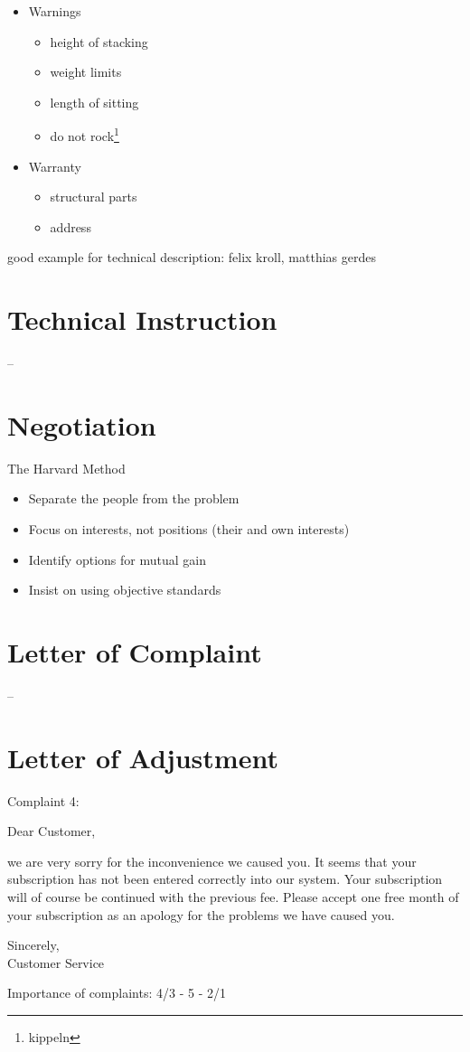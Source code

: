 \begin{itemize}
\begin{itemize}
\begin{itemize}
\end{itemize}
\end{itemize}
\item Warnings
\begin{itemize}
\item height of stacking
\item weight limits
\item length of sitting
\item do not rock\footnote{kippeln}
\end{itemize}
\item Warranty
\begin{itemize}
\item structural parts
\item address
\end{itemize}
\end{itemize}

good example for technical description: felix kroll, matthias gerdes

\section{Technical Instruction}
--

\section{Negotiation}
The Harvard Method
\begin{itemize}
\item Separate the people from the problem
\item Focus on interests, not positions (their and own interests)
\item Identify options for mutual gain
\item Insist on using objective standards
\end{itemize}

\section{Letter of Complaint}
--

\section{Letter of Adjustment}
Complaint 4:\medskip

Dear Customer, 

we are very sorry for the inconvenience we caused you. It seems that your subscription has not been entered correctly into our system. Your subscription will of course be continued with the previous fee. Please accept one free month of your subscription as an apology for the problems we have caused you.

Sincerely,\\
Customer Service\medskip

Importance of complaints: 4/3 - 5 - 2/1

